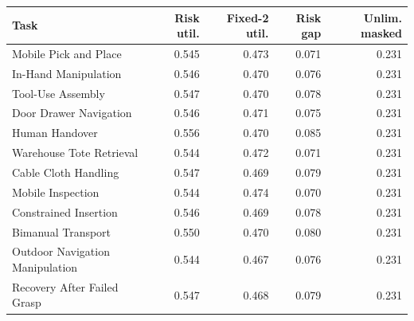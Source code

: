 \begin{tabular}{lrrrr}
\toprule
Task & Risk util. & Fixed-2 util. & Risk gap & Unlim. masked \\
\midrule
Mobile Pick and Place & 0.545 & 0.473 & 0.071 & 0.231 \\
In-Hand Manipulation & 0.546 & 0.470 & 0.076 & 0.231 \\
Tool-Use Assembly & 0.547 & 0.470 & 0.078 & 0.231 \\
Door Drawer Navigation & 0.546 & 0.471 & 0.075 & 0.231 \\
Human Handover & 0.556 & 0.470 & 0.085 & 0.231 \\
Warehouse Tote Retrieval & 0.544 & 0.472 & 0.071 & 0.231 \\
Cable Cloth Handling & 0.547 & 0.469 & 0.079 & 0.231 \\
Mobile Inspection & 0.544 & 0.474 & 0.070 & 0.231 \\
Constrained Insertion & 0.546 & 0.469 & 0.078 & 0.231 \\
Bimanual Transport & 0.550 & 0.470 & 0.080 & 0.231 \\
Outdoor Navigation Manipulation & 0.544 & 0.467 & 0.076 & 0.231 \\
Recovery After Failed Grasp & 0.547 & 0.468 & 0.079 & 0.231 \\
\bottomrule
\end{tabular}
